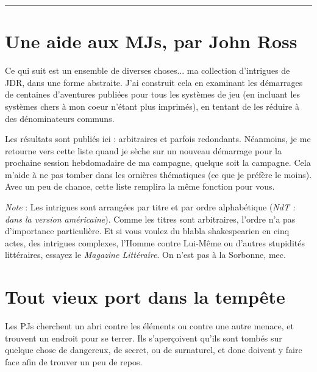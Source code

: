 \begin{multicols}{2}

\tableofcontents

\vspace{0.5cm}

\hrule

\section*{Une aide aux MJs, par John Ross}

Ce qui suit est un ensemble de diverses choses... ma collection d'intrigues de JDR, dans une forme abstraite. J'ai construit cela en examinant les démarrages de centaines d'aventures publiées pour tous les systèmes de jeu (en incluant les systèmes chers à mon coeur n'étant plus imprimés), en tentant de les réduire à des dénominateurs communs.

Les résultats sont publiés ici : arbitraires et parfois redondants. Néanmoins, je me retourne vers cette liste quand je sèche sur un nouveau démarrage pour la prochaine session hebdomadaire de ma campagne, quelque soit la campagne. Cela m'aide à ne pas tomber dans les ornières thématiques (ce que je préfère le moins). Avec un peu de chance, cette liste remplira la même fonction pour vous.

\emph{Note} : Les intrigues sont arrangées par titre et par ordre alphabétique (\textit{NdT : dans la version américaine}). Comme les titres sont arbitraires, l'ordre n'a pas d'importance particulière. Et si vous voulez du blabla shakespearien en cinq actes, des intrigues complexes, l'Homme contre Lui-Même ou d'autres stupidités littéraires, essayez le \textit{Magazine Littéraire}. On n'est pas à la Sorbonne, mec.

\section{Tout vieux port dans la tempête}
\label{port}


Les PJs cherchent un abri contre les éléments ou contre une autre menace, et trouvent un endroit pour se terrer. Ils s'aperçoivent qu'ils sont tombés sur quelque chose de dangereux, de secret, ou de surnaturel, et donc doivent y faire face afin de trouver un peu de repos.


\end{multicols}
